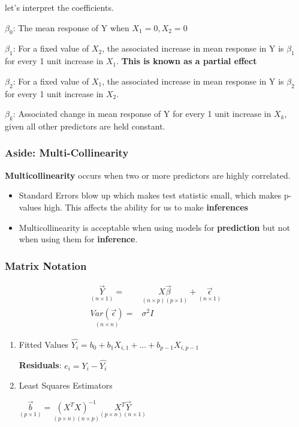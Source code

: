 \documentclass[11pt]{article}
\begin{document}
let's interpret the coefficients.

\(\beta_0\): The mean response of Y when \(X_1 = 0, X_2 = 0\)

\(\beta_1\): For a fixed value of \(X_2\), the associated increase in mean response
in Y is \(\beta_1\) for every 1 unit increase in \(X_1\). \textbf{This is known as a
partial effect}

\(\beta_2\): For a fixed value of \(X_1\), the associated increase in mean response
in Y is \(\beta_2\) for every 1 unit increase in \(X_2\).

\(\beta_k\): Associated change in mean response of Y for every 1 unit increase in
\(X_k\), given all other predictors are held constant.

\subsubsection{Aside: Multi-Collinearity}
\label{sec:orgc9abeea}
\textbf{Multicollinearity} occurs when two or more predictors are highly correlated.
\begin{itemize}
\item Standard Errors blow up which makes test statistic small, which makes p-values
high. This affects the ability for us to make \textbf{inferences}
\item Multicollinearity is acceptable when using models for \textbf{prediction} but not
when using them for \textbf{inference}.
\end{itemize}
\subsubsection{Matrix Notation}
\label{sec:orgebefd7b}
\begin{equation}
  \begin{split}
    \underset{(n \times 1)}{\vec{Y}} = & \underset{(n \times p)(p \times 1)}{X \vec{\beta}} + \underset{(n \times 1)}{\vec{\epsilon}}\\
    \underset{(n \times n)}{Var(\vec{\epsilon})} = & \sigma^2 I
  \end{split}
\end{equation}
\begin{enumerate}
\item Fitted Values
\label{sec:org1ec9f36}
\(\hat{Y_i} = b_0 + b_1 X_{i,1} + ... + b_{p - 1} X_{i, p - 1}\)

\textbf{Residuals}: \(e_i = Y_i - \hat{Y_i}\)

\item Least Squares Estimators
\label{sec:org1c4ad6c}

\(\underset{(p \times 1)}{\vec{b}} = \underset{(p \times n)(n \times p)}{(X^T X)^{-1}} \underset{(p \times n)(n \times 1)}{X^T \vec{Y}}\)
\end{enumerate}
\end{document}
